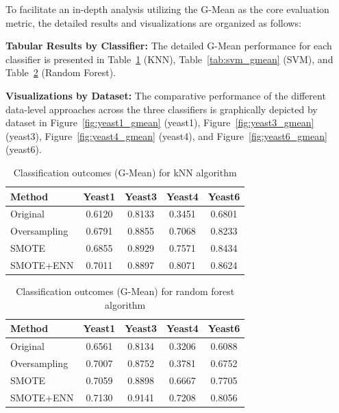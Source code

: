 \documentclass[sigconf]{acmart}
\begin{document}
To facilitate an in-depth analysis utilizing the G-Mean as the core evaluation metric, the detailed results and visualizations are organized as follows:

\textbf{Tabular Results by Classifier:} The detailed G-Mean performance for each classifier is presented in Table~\ref{tab:knn_gmean} (KNN), Table~\ref{tab:svm_gmean} (SVM), and Table~\ref{tab:rf_gmean} (Random Forest).

\textbf{Visualizations by Dataset:} The comparative performance of the different data-level approaches across the three classifiers is graphically depicted by dataset in Figure~\ref{fig:yeast1_gmean} (yeast1), Figure~\ref{fig:yeast3_gmean} (yeast3), Figure~\ref{fig:yeast4_gmean} (yeast4), and Figure~\ref{fig:yeast6_gmean} (yeast6).


\clearpage
\begin{table}[h]
  \centering
  \caption{Classification outcomes (G-Mean) for kNN algorithm}
  \label{tab:knn_gmean}
  \small
  \begin{tabular}{lcccc}
    \toprule
    Method & Yeast1 & Yeast3 & Yeast4 & Yeast6 \\
    \midrule
    Original & 0.6120 & 0.8133 & 0.3451 & 0.6801 \\
    Oversampling & 0.6791 & 0.8855 & 0.7068 & 0.8233 \\
    SMOTE & 0.6855 & 0.8929 & 0.7571 & 0.8434 \\
    SMOTE+ENN & 0.7011 & 0.8897 & 0.8071 & 0.8624 \\
    \bottomrule
  \end{tabular}
\end{table}

\begin{table}[h]
  \centering
  \caption{Classification outcomes (G-Mean) for random forest algorithm}
  \label{tab:rf_gmean}
  \small
  \begin{tabular}{lcccc}
    \toprule
    Method & Yeast1 & Yeast3 & Yeast4 & Yeast6 \\
    \midrule
    Original & 0.6561 & 0.8134 & 0.3206 & 0.6088 \\
    Oversampling & 0.7007 & 0.8752 & 0.3781 & 0.6752 \\
    SMOTE & 0.7059 & 0.8898 & 0.6667 & 0.7705 \\
    SMOTE+ENN & 0.7130 & 0.9141 & 0.7208 & 0.8056 \\
    \bottomrule
  \end{tabular}
\end{table}
\end{document}
